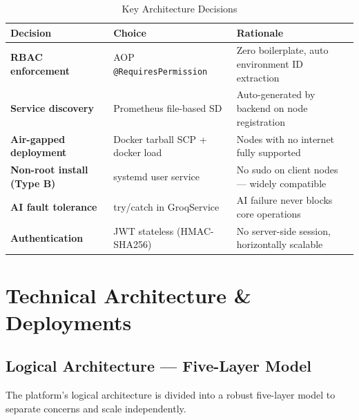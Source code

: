 \documentclass[12pt,a4paper]{report}
\begin{document}
\begin{table}[H]
\centering
\renewcommand{\arraystretch}{1.5}
\begin{tabular}{|p{4cm}|p{5cm}|p{5.5cm}|}
\hline
\textbf{Decision} & \textbf{Choice} & \textbf{Rationale} \\
\hline
\textbf{RBAC enforcement} & AOP \texttt{@RequiresPermission} & Zero boilerplate, auto environment ID extraction \\
\hline
\textbf{Service discovery} & Prometheus file-based SD & Auto-generated by backend on node registration \\
\hline
\textbf{Air-gapped deployment} & Docker tarball SCP + docker load & Nodes with no internet fully supported \\
\hline
\textbf{Non-root install (Type B)} & systemd user service & No sudo on client nodes — widely compatible \\
\hline
\textbf{AI fault tolerance} & try/catch in GroqService & AI failure never blocks core operations \\
\hline
\textbf{Authentication} & JWT stateless (HMAC-SHA256) & No server-side session, horizontally scalable \\
\hline
\end{tabular}
\caption{Key Architecture Decisions}
\label{tab:arch_decisions}
\end{table}

\newpage

\chapter{Technical Architecture \& Deployments}

\section{Logical Architecture — Five-Layer Model}

The platform's logical architecture is divided into a robust five-layer model to separate concerns and scale independently.
\end{document}
